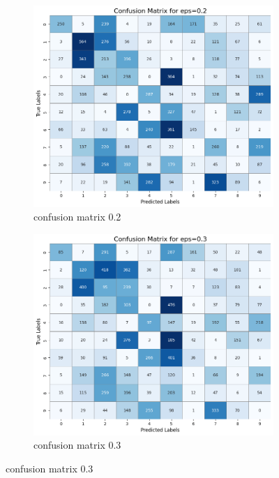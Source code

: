 \documentclass[11pt,onside]{article}
\begin{document}
\begin{figure}[h]
  \centering
  \begin{subfigure}[b]{0.49\textwidth}
    \centering
    \includegraphics[width=\textwidth]{V2_images/target_confusion_matrix_eps_0.2_attack_1.png}
    \caption{confusion matrix 0.2}
    \label{fig:image1}
  \end{subfigure}
  \hfill
  \begin{subfigure}[b]{0.49\textwidth}
    \centering
    \includegraphics[width=\textwidth]{V2_images/target_confusion_matrix_eps_0.3_attack_1.png}
    \caption{confusion matrix 0.3}
    \label{fig:image2}
  \end{subfigure}

\end{figure}
\end{document}
